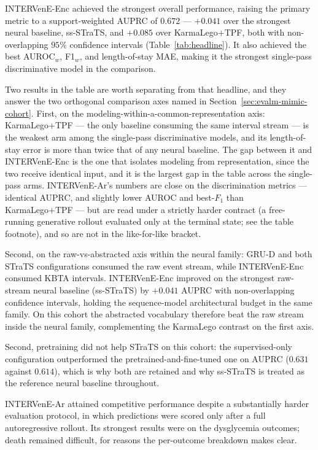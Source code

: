 INTERVenE-Enc achieved the strongest overall performance, raising the primary metric to a support-weighted AUPRC of $0.672$ --- $+0.041$ over the strongest neural baseline, ss-STraTS, and $+0.085$ over KarmaLego+TPF, both with non-overlapping $95\%$ confidence intervals (Table~\ref{tab:headline}). It also achieved the best AUROC$_w$, F1$_w$, and length-of-stay MAE, making it the strongest single-pass discriminative model in the comparison.

Two results in the table are worth separating from that headline, and they answer the two orthogonal comparison axes named in Section~\ref{sec:evalm-mimic-cohort}. First, on the modeling-within-a-common-representation axis: KarmaLego+TPF --- the only baseline consuming the same interval stream --- is the weakest arm among the single-pass discriminative models, and its length-of-stay error is more than twice that of any neural baseline. The gap between it and INTERVenE-Enc is the one that isolates modeling from representation, since the two receive identical input, and it is the largest gap in the table across the single-pass arms. INTERVenE-Ar's numbers are close on the discrimination metrics --- identical AUPRC, and slightly lower AUROC and best-$F_1$ than KarmaLego+TPF --- but are read under a strictly harder contract (a free-running generative rollout evaluated only at the terminal state; see the table footnote), and so are not in the like-for-like bracket.

Second, on the raw-vs-abstracted axis within the neural family: GRU-D and both STraTS configurations consumed the raw event stream, while INTERVenE-Enc consumed KBTA intervals. INTERVenE-Enc improved on the strongest raw-stream neural baseline (ss-STraTS) by $+0.041$ AUPRC with non-overlapping confidence intervals, holding the sequence-model architectural budget in the same family. On this cohort the abstracted vocabulary therefore beat the raw stream inside the neural family, complementing the KarmaLego contrast on the first axis.

Second, pretraining did not help STraTS on this cohort: the supervised-only configuration outperformed the pretrained-and-fine-tuned one on AUPRC ($0.631$ against $0.614$), which is why both are retained and why ss-STraTS is treated as the reference neural baseline throughout.

INTERVenE-Ar attained competitive performance despite a substantially harder evaluation protocol, in which predictions were scored only after a full autoregressive rollout. Its strongest results were on the dysglycemia outcomes; death remained difficult, for reasons the per-outcome breakdown makes clear.

